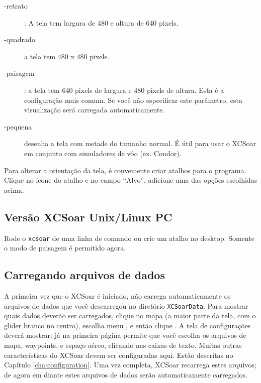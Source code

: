 \begin{description}
\item[-retrato] :   A tela tem largura de 480 e altura de 640 pixels.
\item[-quadrado] a tela tem 480 x 480 pixels.
\item[-paisagem] :   a tela tem 640 pixels de largura e 480 pixels de altura.  Esta é a configuração mais comum.  Se você não especificar este parâmetro, esta visualização será carregada automaticamente.
\item[-pequena] desenha a tela com metade do tamanho normal.  É útil para usar o XCSoar em conjunto com simuladores de vôo (ex. Condor).
\end{description}
Para alterar a orientação da tela, é conveniente criar atalhos para o programa.  Clique no ícone do atalho e no campo “Alvo”, adicione uma das opções escolhidas acima.

\subsection*{Versão XCSoar Unix/Linux PC}
Rode o \verb|xcsoar| de uma linha de comando ou crie um atalho no desktop.  
Somente o modo de paisagem é permitido agora.


\subsection*{Carregando arquivos de dados}\label{sec:loaddatafiles}
A primeira vez que o XCSoar é iniciado, não carrega automaticamente os arquivos de dados que você descarregou no diretório \verb|XCSoarData|.  
Para mostrar quais dados deverão ser carregados, clique no mapa (a maior parte da tela, com o glider branco no centro), escolha menu , e então clique 
.  A tela de configurações deverá mostrar:
já na primeira página permite que você escolha os arquivos de mapa, waypoints, e espaço aéreo, clicando nas caixas de texto.  Muitas outras características do XCSoar devem ser configuradas aqui.  Estão descritas no Capítulo 
\ref{cha:configuration}.
Uma vez completa, XCSoar recarrega estes arquivos; de agora em diante estes arquivos de dados serão automaticamente carregados.

